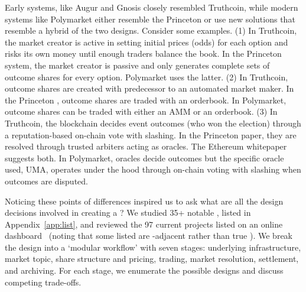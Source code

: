 Early systems, like Augur and Gnosis closely resembled Truthcoin, while modern systems like Polymarket either resemble the Princeton \depm or use new solutions that resemble a hybrid of the two designs. Consider some examples. (1) In Truthcoin, the market creator is active in setting initial prices (\ie odds) for each option and risks its own money until enough traders balance the book. In the Princeton system, the market creator is passive and only generates complete sets of outcome shares for every option. Polymarket uses the latter. (2) In Truthcoin, outcome shares are created with predecessor to an automated market maker. In the Princeton \depm, outcome shares are traded with an orderbook. In Polymarket, outcome shares can be traded with either an AMM or an orderbook. (3) In Truthcoin, the blockchain decides event outcomes (\eg who won the election) through a reputation-based on-chain vote with slashing. In the Princeton paper, they are resolved through trusted arbiters acting as oracles. The Ethereum whitepaper suggests both. In Polymarket, oracles decide outcomes but the specific oracle used, UMA, operates under the hood through on-chain voting with slashing when outcomes are disputed.

Noticing these points of differences inspired us to ask what are all the design decisions involved in creating a \depm? We studied 35+ notable \depms, listed in Appendix~\ref{app:list}, and reviewed the 97 current projects listed on an online dashboard~\cite{Sal25} (noting that some listed are \depm-adjacent rather than true \depms). We break the design into a `modular workflow' with seven stages: underlying infrastructure, market topic, share structure and pricing, trading, market resolution, settlement, and archiving. For each stage, we enumerate the possible designs and discuss competing trade-offs. 

